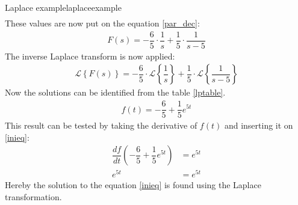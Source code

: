 \begin{example}{Laplace example}{laplaceexample}
\begin{align*}
\end{align*}
These values are now put on the equation \ref{par_dec}:
\begin{align*}
F(s) =  - \dfrac{6}{5} \cdot \dfrac{1}{s} + \dfrac{1}{5} \cdot \dfrac{1}{s-5}
\end{align*}
The inverse Laplace transform is now applied:
\begin{align*}
\mathcal{L} \left\{F(s) \right\} =  - \dfrac{6}{5} \cdot \mathcal{L} \left\{\dfrac{1}{s} \right\} + \dfrac{1}{5} \cdot \mathcal{L} \left\{\dfrac{1}{s-5} \right\}
\end{align*}
Now the solutions can be identified from the table \ref{lptable}.
\begin{align*}
f(t) = - \dfrac{6}{5} + \dfrac{1}{5}e^{5t}
\end{align*}
This result can be tested by taking the derivative of $f(t)$ and inserting it on \ref{inieq}:
\begin{align*}
\dfrac{df}{dt} \left(- \dfrac{6}{5} + \dfrac{1}{5}e^{5t} \right) &= e^{5t} \\
e^{5t} &= e^{5t}
\end{align*}
Hereby the solution to the equation \ref{inieq} is found using the Laplace transformation.
\end{example}